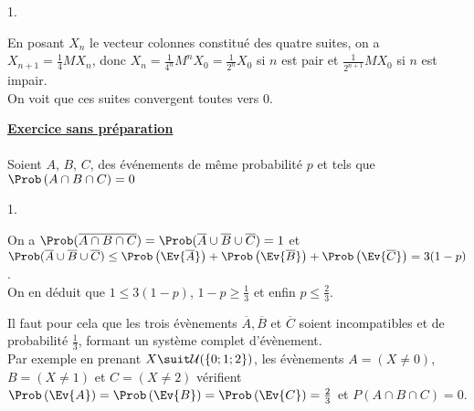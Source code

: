 \documentclass[11pt]{article}%
\begin{document}
\begin{exercice}
\begin{noliste}{1.}
 \item En posant $X_{n}$ le vecteur colonnes constitué des quatre
suites, on a $X_{n + 1} = \frac{1}{4} M X_{n}$, donc $X_{n} =
\frac{1}{4^{n}} M^{n} X_{0} = \frac{1}{2^{n}} X_{0}$ si $n$ est pair et
$\frac{1}{2^{n + 1}} M X_{0}$ si $n$ est impair. \\
 On voit que ces suites convergent toutes vers 0. \\
 \end{noliste}
 

 \noindent \textbf{\underline{Exercice sans préparation }}
 \\
 \\
 Soient $A$, $B$, $C$, des événements de même probabilité $p$ et tels
 que $\Prob\left( A\cap B\cap C\right) = 0$

 \begin{noliste}{1.}
 \setlength{\itemsep}{4mm}
 \item On a $\Prob( \overline{ A \cap B \cap C} ) = \Prob( \overline{A}
\cup \overline{B} \cup \overline{C} ) = 1$ et $ \Prob( \overline{A}
\cup \overline{B} \cup \overline{C} ) \leq \Prob\left(\Ev{
\overline{A}}\right) + \Prob\left(\Ev{\overline{B}}\right) +
\Prob\left(\Ev{ \overline{C}}\right) = 3(1-p)$. \\
 On en déduit que $1 \leq 3(1-p)$, $1-p \geq \frac{1}{3}$ et enfin $p
\leq \frac{2}{3}$. \\

 \item Il faut pour cela que les trois évènements $\overline{A},
\overline{B}$ et $\overline{C}$ soient incompatibles et de probabilité
$\frac{1}{3}$, formant un système complet d'évènement. \\
 Par exemple en prenant $X \suit \mathcal{U} ( \{ 0 ; 1 ; 2 \} )$, les
évènements $A = (X \neq 0)$, $B = (X \neq 1)$ et $C = (X \neq 2)$
vérifient $\Prob\left(\Ev{A}\right) = \Prob\left(\Ev{B}\right) =
\Prob\left(\Ev{C}\right) = \frac{2}{3}$ et $P ( A \cap B \cap C) = 0$.
\\


\end{noliste}
\end{exercice}
\end{document}
